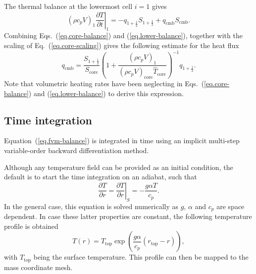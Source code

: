 \documentclass{article}
\begin{document}
The thermal balance at the lowermost cell $i=1$ gives
\begin{equation}
    (\rho c_p V)_1 \left.\frac{\partial T}{\partial t}\right|_1 = -q_{1+\frac{1}{2}} S_{1+\frac{1}{2}} + q_\mathrm{cmb} S_\mathrm{cmb}.
    \label{eq.lower-balance}
\end{equation}
Combining Eqs.~(\ref{eq.core-balance}) and (\ref{eq.lower-balance}), together with the scaling of Eq.~(\ref{eq.core-scaling}) gives the following estimate for the heat flux
\begin{equation}
q_\mathrm{cmb}=\frac{S_{1+\frac{1}{2}}}{S_\mathrm{core}}\left(1+\frac{(\rho c_p V)_1}{(\rho c_p V)_\mathrm{core}\hat{T}_\mathrm{core}}\right)^{-1} q_{1+\frac{1}{2}}.
\end{equation}
Note that volumetric heating rates have been neglecting in Eqs.~(\ref{eq.core-balance}) and (\ref{eq.lower-balance}) to derive this expression.

\subsection{Time integration}

Equation~(\ref{eq.fvm-balance}) is integrated in time using an implicit multi-step variable-order backward differentiation method.

Although any temperature field can be provided as an initial condition, the default is to start the time integration on an adiabat, such that
\begin{equation}
    \frac{\partial T}{\partial r} =
    \left.\frac{\partial T}{\partial r}\right|_S = -\frac{g\alpha T}{c_p}.
\end{equation}
In the general case, this equation is solved numerically as $g$, $\alpha$ and $c_p$ are space dependent. In case these latter properties are constant, the following temperature profile is obtained
\begin{equation}
    T(r) = T_\mathrm{top} \exp\left(\frac{g\alpha}{c_p}(r_\mathrm{top}-r)\right),
\end{equation}
with $T_\mathrm{top}$ being the surface temperature. This profile can then be mapped to the mass coordinate mesh.
\end{document}
